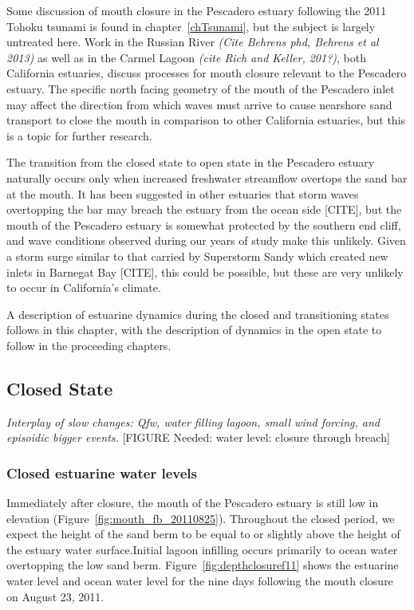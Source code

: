 {Some discussion of mouth closure in the Pescadero estuary following the 2011 Tohoku tsunami is found in chapter~\ref{chTsunami}, but the subject is largely untreated here. Work in the Russian River \emph{(Cite Behrens phd, Behrens et al 2013)} as well as in the Carmel Lagoon \emph{(cite Rich and Keller, 201?)}, both California estuaries, discuss processes for mouth closure relevant to the Pescadero estuary. The specific north facing geometry of the mouth of the Pescadero inlet may affect the direction from which waves must arrive to cause nearshore sand transport to close the mouth in comparison to other California estuaries, but this is a topic for further research.

The transition from the closed state to open state in the Pescadero estuary naturally occurs only when increased freshwater streamflow overtops the sand bar at the mouth. It has been suggested in other estuaries that storm waves overtopping the bar may breach the estuary from the ocean side [CITE], but the mouth of the Pescadero estuary is
somewhat protected by the southern end cliff, and wave conditions observed during our years of study make this unlikely. Given a storm surge similar to that carried by Superstorm Sandy which created new inlets in Barnegat Bay [CITE], this could be possible, but these are very unlikely to occur in California's climate.

A description of estuarine dynamics during the closed and transitioning states follows in this chapter, with the description of dynamics in the open state to follow in the proceeding chapters.


\subsection{Closed State} \label{ssec:ClosedDynamics}

\emph{Interplay of slow changes: Qfw, water filling lagoon, small wind forcing, and episoidic bigger events.}
[FIGURE Needed: water level: closure through breach]


\subsubsection{Closed estuarine water levels} \label{cl_wl}

Immediately after closure, the mouth of the Pescadero estuary is still low in elevation (Figure~\ref{fig:mouth_fb_20110825}). Throughout the closed period, we expect the height of the sand berm to be equal to or slightly above the height of the estuary water surface.Initial lagoon infilling occurs primarily to ocean water overtopping the low sand berm. Figure~\ref{fig:depthclosuref11} shows the estuarine water level and ocean water level for the nine days following the mouth closure on August 23, 2011.  

}
